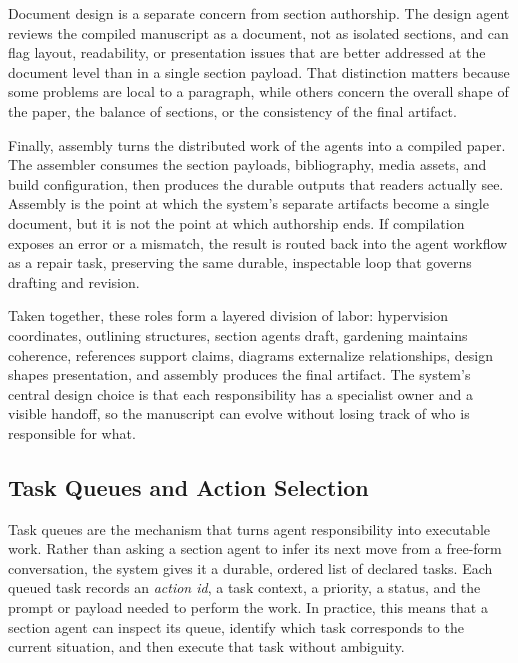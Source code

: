 \documentclass[11pt]{article}
\begin{document}
Document design is a separate concern from section authorship. The design agent reviews the compiled manuscript as a document, not as isolated sections, and can flag layout, readability, or presentation issues that are better addressed at the document level than in a single section payload. That distinction matters because some problems are local to a paragraph, while others concern the overall shape of the paper, the balance of sections, or the consistency of the final artifact.

Finally, assembly turns the distributed work of the agents into a compiled paper. The assembler consumes the section payloads, bibliography, media assets, and build configuration, then produces the durable outputs that readers actually see. Assembly is the point at which the system's separate artifacts become a single document, but it is not the point at which authorship ends. If compilation exposes an error or a mismatch, the result is routed back into the agent workflow as a repair task, preserving the same durable, inspectable loop that governs drafting and revision.

Taken together, these roles form a layered division of labor: hypervision coordinates, outlining structures, section agents draft, gardening maintains coherence, references support claims, diagrams externalize relationships, design shapes presentation, and assembly produces the final artifact. The system's central design choice is that each responsibility has a specialist owner and a visible handoff, so the manuscript can evolve without losing track of who is responsible for what.



\subsection{Task Queues and Action Selection}


Task queues are the mechanism that turns agent responsibility into executable work. Rather than asking a section agent to infer its next move from a free-form conversation, the system gives it a durable, ordered list of declared tasks. Each queued task records an \emph{action id}, a task context, a priority, a status, and the prompt or payload needed to perform the work. In practice, this means that a section agent can inspect its queue, identify which task corresponds to the current situation, and then execute that task without ambiguity.
\end{document}
